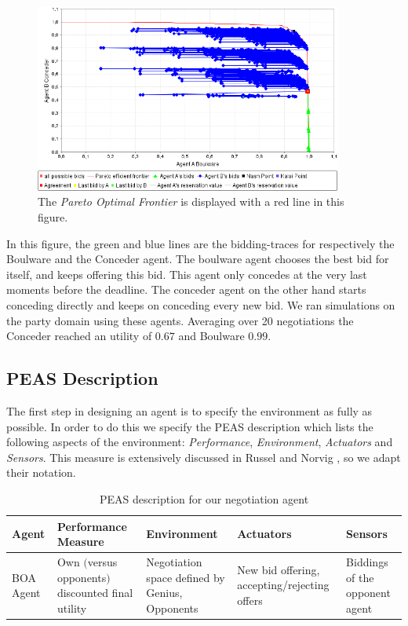 \documentclass[a4paper,10pt]{article}
\begin{document}
\begin{figure}[H]
\begin{center}
 \includegraphics[width=0.9\textwidth]{traceConcederBoulware.png}
 \caption{The \emph{Pareto Optimal Frontier} is displayed with a red line in this figure.}
 \label{fig:pareto} 
\end{center}
\end{figure}

In this figure, the green and blue lines are the bidding-traces for respectively the Boulware and the Conceder agent. The boulware agent chooses the best bid for itself, and keeps offering this bid. This agent only concedes at the very last moments before the deadline. The conceder agent on the other hand starts conceding directly and keeps on conceding every new bid. We ran simulations on the party domain using these agents. Averaging over 20 negotiations the Conceder reached an utility of $0.67$ and
Boulware $0.99$. 
 
\subsection{PEAS Description}

The first step in designing an agent is to specify the environment as fully as possible. In order to do this we specify the PEAS description which lists the following aspects of the environment: \emph{Performance}, \emph{Environment}, \emph{Actuators} and \emph{Sensors}. This measure is extensively discussed in Russel and Norvig \cite{russel-norvig}, so we adapt their notation.

\begin{table}[H]
  \small
    \begin{tabular}{|p{1.8cm}|p{3cm}|p{3cm}|p{3cm}|p{3cm}|}
    \hline
    \textbf{Agent} & \textbf{Performance \mbox{Measure}} & \textbf{Environment} & \textbf{Actuators} & \textbf{Sensors} \\
    \hline
    BOA Agent & Own $($versus opponents$)$ discounted final utility & Negotiation space defined by Genius, \mbox{Opponents} & New bid offering, \mbox{accepting/rejecting} offers & Biddings of the \mbox{opponent} agent \\
    \hline
    \end{tabular}
    
    \caption{PEAS description for our negotiation agent \label{table:peas-description}}
\end{table}
\end{document}
